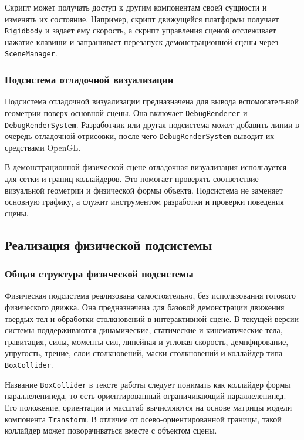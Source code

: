 Скрипт может получать доступ к другим компонентам своей сущности и изменять их
состояние. Например, скрипт движущейся платформы получает \texttt{Rigidbody}
и задает ему скорость, а скрипт управления сценой отслеживает нажатие клавиши и
запрашивает перезапуск демонстрационной сцены через \texttt{SceneManager}.

\subsubsection{Подсистема отладочной визуализации}

Подсистема отладочной визуализации предназначена для вывода вспомогательной
геометрии поверх основной сцены. Она включает \texttt{DebugRenderer} и
\texttt{DebugRenderSystem}. Разработчик или другая подсистема может добавить
линии в очередь отладочной отрисовки, после чего \texttt{DebugRenderSystem}
выводит их средствами OpenGL.

В демонстрационной физической сцене отладочная визуализация используется для
сетки и границ коллайдеров. Это помогает проверять соответствие визуальной
геометрии и физической формы объекта. Подсистема не заменяет основную графику,
а служит инструментом разработки и проверки поведения сцены.

\subsection{Реализация физической подсистемы}

\subsubsection{Общая структура физической подсистемы}

Физическая подсистема реализована самостоятельно, без использования готового
физического движка. Она предназначена для базовой демонстрации движения твердых
тел и обработки столкновений в интерактивной сцене. В текущей версии системы
поддерживаются динамические, статические и кинематические тела, гравитация,
силы, моменты сил, линейная и угловая скорость, демпфирование, упругость,
трение, слои столкновений, маски столкновений и коллайдер типа \texttt{BoxCollider}.

Название \texttt{BoxCollider} в тексте работы следует понимать как
коллайдер формы параллелепипеда, то есть ориентированный ограничивающий
параллелепипед. Его положение, ориентация и масштаб вычисляются на основе
матрицы модели компонента \texttt{Transform}. В отличие от осево-ориентированной
границы, такой коллайдер может поворачиваться вместе с объектом сцены.

